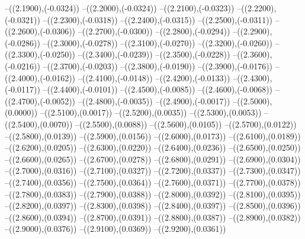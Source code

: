 {	--({\sx*(2.1900)},{\sy*(-0.0324)})
	--({\sx*(2.2000)},{\sy*(-0.0324)})
	--({\sx*(2.2100)},{\sy*(-0.0323)})
	--({\sx*(2.2200)},{\sy*(-0.0321)})
	--({\sx*(2.2300)},{\sy*(-0.0318)})
	--({\sx*(2.2400)},{\sy*(-0.0315)})
	--({\sx*(2.2500)},{\sy*(-0.0311)})
	--({\sx*(2.2600)},{\sy*(-0.0306)})
	--({\sx*(2.2700)},{\sy*(-0.0300)})
	--({\sx*(2.2800)},{\sy*(-0.0294)})
	--({\sx*(2.2900)},{\sy*(-0.0286)})
	--({\sx*(2.3000)},{\sy*(-0.0278)})
	--({\sx*(2.3100)},{\sy*(-0.0270)})
	--({\sx*(2.3200)},{\sy*(-0.0260)})
	--({\sx*(2.3300)},{\sy*(-0.0250)})
	--({\sx*(2.3400)},{\sy*(-0.0239)})
	--({\sx*(2.3500)},{\sy*(-0.0228)})
	--({\sx*(2.3600)},{\sy*(-0.0216)})
	--({\sx*(2.3700)},{\sy*(-0.0203)})
	--({\sx*(2.3800)},{\sy*(-0.0190)})
	--({\sx*(2.3900)},{\sy*(-0.0176)})
	--({\sx*(2.4000)},{\sy*(-0.0162)})
	--({\sx*(2.4100)},{\sy*(-0.0148)})
	--({\sx*(2.4200)},{\sy*(-0.0133)})
	--({\sx*(2.4300)},{\sy*(-0.0117)})
	--({\sx*(2.4400)},{\sy*(-0.0101)})
	--({\sx*(2.4500)},{\sy*(-0.0085)})
	--({\sx*(2.4600)},{\sy*(-0.0068)})
	--({\sx*(2.4700)},{\sy*(-0.0052)})
	--({\sx*(2.4800)},{\sy*(-0.0035)})
	--({\sx*(2.4900)},{\sy*(-0.0017)})
	--({\sx*(2.5000)},{\sy*(0.0000)})
	--({\sx*(2.5100)},{\sy*(0.0017)})
	--({\sx*(2.5200)},{\sy*(0.0035)})
	--({\sx*(2.5300)},{\sy*(0.0053)})
	--({\sx*(2.5400)},{\sy*(0.0070)})
	--({\sx*(2.5500)},{\sy*(0.0088)})
	--({\sx*(2.5600)},{\sy*(0.0105)})
	--({\sx*(2.5700)},{\sy*(0.0122)})
	--({\sx*(2.5800)},{\sy*(0.0139)})
	--({\sx*(2.5900)},{\sy*(0.0156)})
	--({\sx*(2.6000)},{\sy*(0.0173)})
	--({\sx*(2.6100)},{\sy*(0.0189)})
	--({\sx*(2.6200)},{\sy*(0.0205)})
	--({\sx*(2.6300)},{\sy*(0.0220)})
	--({\sx*(2.6400)},{\sy*(0.0236)})
	--({\sx*(2.6500)},{\sy*(0.0250)})
	--({\sx*(2.6600)},{\sy*(0.0265)})
	--({\sx*(2.6700)},{\sy*(0.0278)})
	--({\sx*(2.6800)},{\sy*(0.0291)})
	--({\sx*(2.6900)},{\sy*(0.0304)})
	--({\sx*(2.7000)},{\sy*(0.0316)})
	--({\sx*(2.7100)},{\sy*(0.0327)})
	--({\sx*(2.7200)},{\sy*(0.0337)})
	--({\sx*(2.7300)},{\sy*(0.0347)})
	--({\sx*(2.7400)},{\sy*(0.0356)})
	--({\sx*(2.7500)},{\sy*(0.0364)})
	--({\sx*(2.7600)},{\sy*(0.0371)})
	--({\sx*(2.7700)},{\sy*(0.0378)})
	--({\sx*(2.7800)},{\sy*(0.0383)})
	--({\sx*(2.7900)},{\sy*(0.0388)})
	--({\sx*(2.8000)},{\sy*(0.0392)})
	--({\sx*(2.8100)},{\sy*(0.0395)})
	--({\sx*(2.8200)},{\sy*(0.0397)})
	--({\sx*(2.8300)},{\sy*(0.0398)})
	--({\sx*(2.8400)},{\sy*(0.0397)})
	--({\sx*(2.8500)},{\sy*(0.0396)})
	--({\sx*(2.8600)},{\sy*(0.0394)})
	--({\sx*(2.8700)},{\sy*(0.0391)})
	--({\sx*(2.8800)},{\sy*(0.0387)})
	--({\sx*(2.8900)},{\sy*(0.0382)})
	--({\sx*(2.9000)},{\sy*(0.0376)})
	--({\sx*(2.9100)},{\sy*(0.0369)})
	--({\sx*(2.9200)},{\sy*(0.0361)})
}
